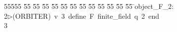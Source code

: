 %
%
\begin{tabbing}
55555 \= 55 \= 55 \= 55 \= 55 \= 55 \= 55 \= 55 \= 55 \= 55 \= 55 \= 55 \= 55 \= \>object\_F\_2:\\[0pt]
2\>$\triangleright$\>(ORBITER)\ v\ 3\ define\ F\ finite\_field\ q\ 2\ end\\[0pt]
3\>\end{tabbing}
